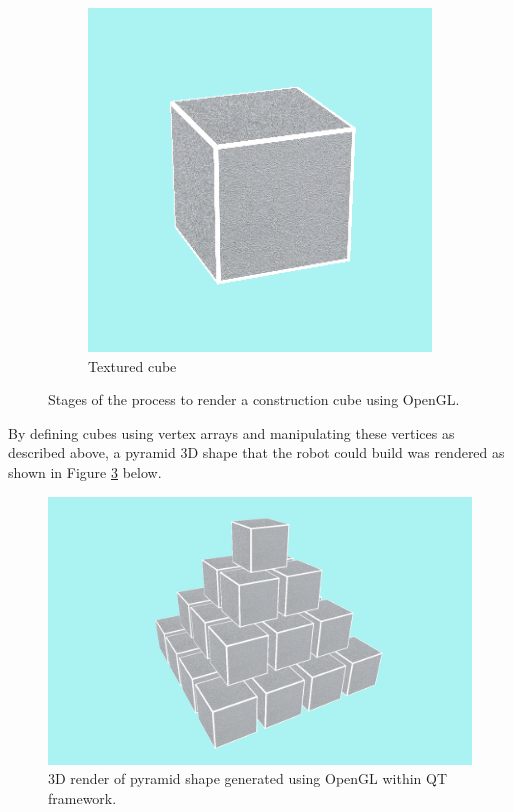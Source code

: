 \begin{figure}[!ht]
	\begin{subfigure}{.32\textwidth}
		\centering
		\includegraphics[width=0.8\linewidth]{figures/cube-render.PNG}
		\caption{Textured cube}
		\label{fig:cube-render}
	\end{subfigure}%
	\caption{Stages of the process to render a construction cube using OpenGL.}
	\label{fig:opengl}
\end{figure}

By defining cubes using vertex arrays and manipulating these vertices as described above, a pyramid 3D shape that the robot could build was rendered as shown in Figure \ref{fig:initial-opengl} below.

\begin{figure}[H]
	\centering
	\includegraphics[width=0.8\linewidth]{figures/initial-opengl-shape.PNG}
	\caption{3D render of pyramid shape generated using OpenGL within QT framework.}
	\label{fig:initial-opengl}
\end{figure}



